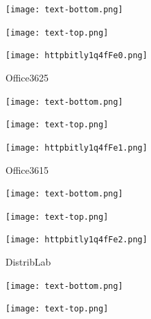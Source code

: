 \documentclass[letterpaper]{article}
\begin{document}
 \centerline{\texttt{[image: text-bottom.png]}} 
 
 \pagebreak 
{} 
 \vspace*{\fill} 
 
  \centerline{\texttt{[image: text-top.png]}} 
 
 \vspace{0.5in} 
 
 \begingroup 
 \centerline{\texttt{[image: httpbitly1q4fFe0.png]}} 
 \endgroup 
 \vspace*{\fill} 

 \hfill{\small Office3625} 

  \vspace{0.7in} 
 
 \centerline{\texttt{[image: text-bottom.png]}} 
 
 \pagebreak 
{} 
 \vspace*{\fill} 
 
  \centerline{\texttt{[image: text-top.png]}} 
 
 \vspace{0.5in} 
 
 \begingroup 
 \centerline{\texttt{[image: httpbitly1q4fFe1.png]}} 
 \endgroup 
 \vspace*{\fill} 

 \hfill{\small Office3615} 

  \vspace{0.7in} 
 
 \centerline{\texttt{[image: text-bottom.png]}} 
 
 \pagebreak 
{} 
 \vspace*{\fill} 
 
  \centerline{\texttt{[image: text-top.png]}} 
 
 \vspace{0.5in} 
 
 \begingroup 
 \centerline{\texttt{[image: httpbitly1q4fFe2.png]}} 
 \endgroup 
 \vspace*{\fill} 

 \hfill{\small DistribLab} 

  \vspace{0.7in} 
 
 \centerline{\texttt{[image: text-bottom.png]}} 
 
 \pagebreak 
{} 
 \vspace*{\fill} 
 
  \centerline{\texttt{[image: text-top.png]}} 
 
 \vspace{0.5in} 
 
\end{document}
